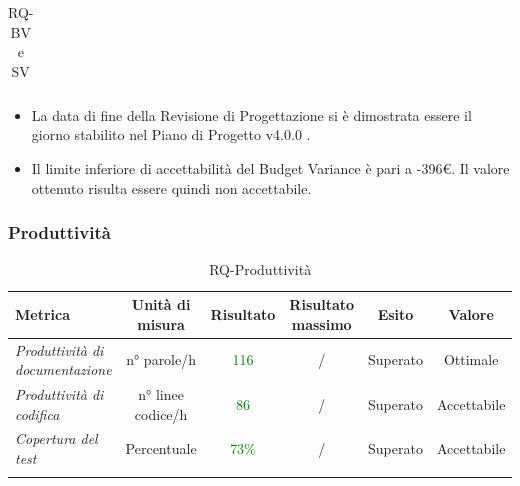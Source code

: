 {\begin{longtable}{|>{\centering}m{2cm}|c|c|c|c|c|}
    	\caption{RQ- BV e SV}\\
    \end{longtable}
    
    
    
    
    \begin{itemize}
    	\item La data di fine della Revisione di Progettazione si è dimostrata essere il
    	giorno stabilito nel Piano di Progetto v4.0.0 .
    	\item  Il limite inferiore di accettabilità del Budget Variance è pari a -396€.
    	Il valore ottenuto risulta essere quindi non accettabile. 
    \end{itemize}
    
    \subsubsection{Produttività}
    
    \begin{longtable}{|>{\centering}m{2cm}|c|c|c|c|c|}
    	\hline
    	\textbf{Metrica} & \textbf{Unità di misura} & \textbf{Risultato} & \textbf{Risultato massimo} & \textbf{Esito} & \textbf{Valore}\\
    	\hline
    	\endhead
    	
    		\emph{Produttività di documentazione} & {n° parole/h} & \textcolor{Green}{116} & / & Superato & Ottimale \\ \hline
    	
   
    		
    		\emph{Produttività di codifica} & {n° linee codice/h} & \textcolor{Green}{86} & / & Superato & Accettabile \\ \hline
    		
    			\emph{Copertura del test} & {Percentuale} & \textcolor{Green}{73\%} & / & Superato & Accettabile \\ \hline
	    	
	    	
    	  	\caption{RQ-Produttività}\\
    	  \end{longtable}
    	  
}
